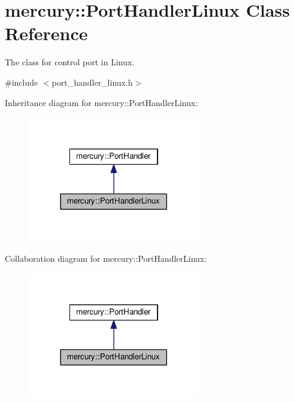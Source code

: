 \hypertarget{classmercury_1_1_port_handler_linux}{}\section{mercury\+:\+:Port\+Handler\+Linux Class Reference}
\label{classmercury_1_1_port_handler_linux}


The class for control port in Linux.  




{\ttfamily \#include $<$port\+\_\+handler\+\_\+linux.\+h$>$}



Inheritance diagram for mercury\+:\+:Port\+Handler\+Linux\+:\nopagebreak
\begin{figure}[H]
\begin{center}
\leavevmode
\includegraphics[width=213pt]{classmercury_1_1_port_handler_linux__inherit__graph}
\end{center}
\end{figure}


Collaboration diagram for mercury\+:\+:Port\+Handler\+Linux\+:\nopagebreak
\begin{figure}[H]
\begin{center}
\leavevmode
\includegraphics[width=213pt]{classmercury_1_1_port_handler_linux__coll__graph}
\end{center}
\end{figure}
